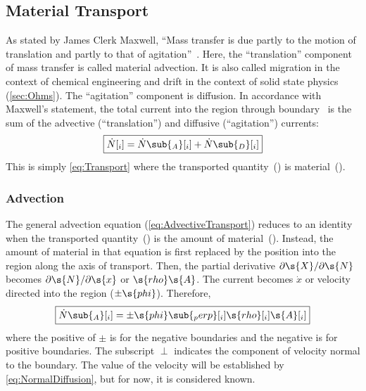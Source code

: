 \subsection{Material Transport}
\label{sec:MaterialTransport}


As stated by James Clerk Maxwell, ``Mass transfer is due partly to the motion of translation and partly to that of agitation''~\cite{Burghardt2013}.  Here, the ``translation'' component of mass transfer is called material advection.  It is also called migration in the context of chemical engineering and drift in the context of solid state physics (\autoref{sec:Ohms}).  The ``agitation'' component is diffusion.  In accordance with Maxwell's statement, the total current into the region through boundary~ is the sum of the advective (``translation'') and diffusive (``agitation'') currents:
\begin{equation}
  \label{eq:MaterialTransport}
  \boxed{\dot{N}[_i]= \dot{N}\sub{_A}[_i] + \dot{N}\sub{_D}[_i]}
\end{equation}
This is simply \autoref{eq:Transport} where the transported quantity~() is material~().


\subsubsection{Advection}

The general advection equation (\ref{eq:AdvectiveTransport}) reduces to an identity when the transported quantity~() is the amount of material~().  Instead, the amount of material in that equation is first replaced by the position into the region along the axis of transport.  Then, the partial derivative $\partial\s{X}/\partial\s{N}$ becomes $\partial\s{N}/\partial\s{x}$ or $\s{rho}\s{A}$.  The current  becomes $\dot{x}$ or velocity directed into the region ($\pm\s{phi}$).  Therefore,
\begin{equation}
  \label{eq:MaterialAdvection}
  \boxed{\dot{N}\sub{_A}[_i] = \pm \s{phi}\sub{_perp}[_i]\s{rho}[_i]\s{A}[_i]}
\end{equation}
where the positive of $\pm$ is for the negative boundaries and the negative is for positive boundaries.  The subscript $\perp$ indicates the component of velocity normal to the boundary.  The value of the velocity will be established by \autoref{eq:NormalDiffusion}, but for now, it is considered known.



